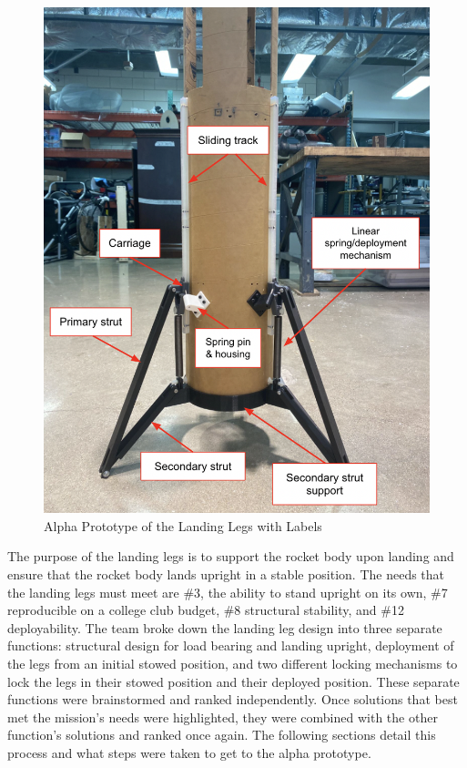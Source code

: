 \begin{figure}[H]
\centering
\includegraphics[scale=0.7]{src/figs/overviewlandinglegpiclabeled.png}
\caption{Alpha Prototype of the Landing Legs with Labels}
\label{figs:legassemble}
\end{figure}

The purpose of the landing legs is to support the rocket body upon landing and ensure that the rocket body lands upright in a stable position. The needs that the landing legs must meet are \#3, the ability to stand upright on its own, \#7 reproducible on a college club budget, \#8 structural stability, and \#12 deployability. The team broke down the landing leg design into three separate functions: structural design for load bearing and landing upright, deployment of the legs from an initial stowed position, and two different locking mechanisms to lock the legs in their stowed position and their deployed position. These separate functions were brainstormed and ranked independently. Once solutions that best met the mission's needs were highlighted, they were combined with the other function's solutions and ranked once again. 
The following sections detail this process and what steps were taken to get to the alpha prototype.

